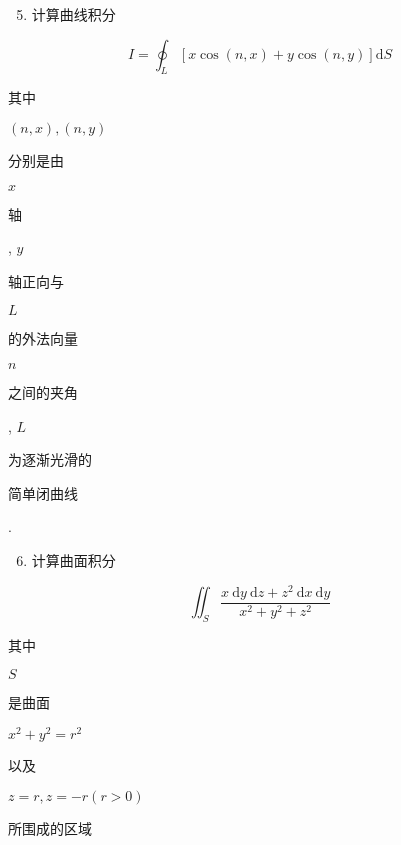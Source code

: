 \documentclass[10pt]{article}
\begin{document}
\begin{enumerate}
  \setcounter{enumi}{4}
  \item \begin{CJK}{UTF8}{mj}计算曲线积分\end{CJK}
\end{enumerate}
$$
I=\oint_{L}[x \cos (n, x)+y \cos (n, y)] \mathrm{d} S
$$
\begin{CJK}{UTF8}{mj}其中\end{CJK} $(n, x),(n, y)$ \begin{CJK}{UTF8}{mj}分别是由\end{CJK} $x$ \begin{CJK}{UTF8}{mj}轴\end{CJK}, $y$ \begin{CJK}{UTF8}{mj}轴正向与\end{CJK} $L$ \begin{CJK}{UTF8}{mj}的外法向量\end{CJK} $n$ \begin{CJK}{UTF8}{mj}之间的夹角\end{CJK}, $L$ \begin{CJK}{UTF8}{mj}为逐渐光滑的\end{CJK} \begin{CJK}{UTF8}{mj}简单闭曲线\end{CJK}.

\begin{enumerate}
  \setcounter{enumi}{5}
  \item \begin{CJK}{UTF8}{mj}计算曲面积分\end{CJK}
\end{enumerate}
$$
\iint_{S} \frac{x \mathrm{~d} y \mathrm{~d} z+z^{2} \mathrm{~d} x \mathrm{~d} y}{x^{2}+y^{2}+z^{2}}
$$
\begin{CJK}{UTF8}{mj}其中\end{CJK} $S$ \begin{CJK}{UTF8}{mj}是曲面\end{CJK} $x^{2}+y^{2}=r^{2}$ \begin{CJK}{UTF8}{mj}以及\end{CJK} $z=r, z=-r(r>0)$ \begin{CJK}{UTF8}{mj}所围成的区域\end{CJK}
\end{document}
